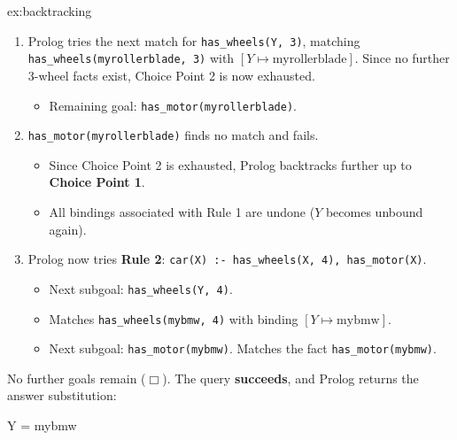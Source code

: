 \begin{example}{ex:backtracking}
\begin{enumerate}[label=\textbf{Step \arabic*:}, leftmargin=*]
    \begin{itemize}
        \item The engine \textbf{backtracks} to the most recent choice point (\textbf{Choice Point 2}).
        \item The binding of $Y$ is \textbf{undone} ($Y$ becomes unbound again).
    \end{itemize}
    \item Prolog tries the next match for \texttt{has\_wheels(Y, 3)}, matching \texttt{has\_wheels(myrollerblade, 3)} with $[Y \mapsto \text{myrollerblade}]$. Since no further 3-wheel facts exist, Choice Point 2 is now exhausted.
    \begin{itemize}
        \item Remaining goal: \texttt{has\_motor(myrollerblade)}.
    \end{itemize}
    \item \texttt{has\_motor(myrollerblade)} finds no match and fails.
    \begin{itemize}
        \item Since Choice Point 2 is exhausted, Prolog backtracks further up to \textbf{Choice Point 1}.
        \item All bindings associated with Rule 1 are undone ($Y$ becomes unbound again).
    \end{itemize}
    \item Prolog now tries \textbf{Rule 2}: \texttt{car(X) :- has\_wheels(X, 4), has\_motor(X)}.
    \begin{itemize}
        \item Next subgoal: \texttt{has\_wheels(Y, 4)}.
        \item Matches \texttt{has\_wheels(mybmw, 4)} with binding $[Y \mapsto \text{mybmw}]$.
        \item Next subgoal: \texttt{has\_motor(mybmw)}. Matches the fact \texttt{has\_motor(mybmw)}.
    \end{itemize}
\end{enumerate}
No further goals remain ($\Box$). The query \textbf{succeeds}, and Prolog returns the answer substitution:
\begin{codeblock}
Y = mybmw
\end{codeblock}
\end{example}

